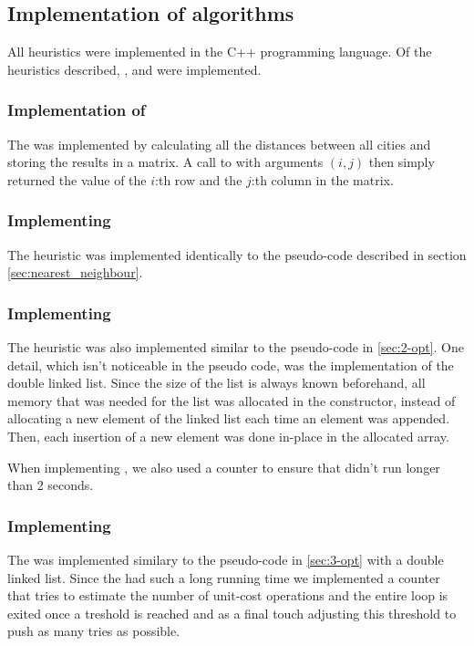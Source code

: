 \subsection{Implementation of algorithms}
\label{sec:implementation_of_algorithms}
All heuristics were implemented in the C++ programming language. Of the
heuristics described, ,  and  were
implemented.

\subsubsection{Implementation of }
The  was implemented by calculating all the distances between
all cities and storing the results in a matrix. A call to  with
arguments $(i, j)$ then simply returned the value of the $i$:th row and the
$j$:th column in the matrix.

\subsubsection{Implementing }
The  heuristic was implemented identically to the 
pseudo-code described in section \ref{sec:nearest_neighbour}.

\subsubsection{Implementing }
\label{sec:implementing_2-opt}
The  heuristic was also implemented similar to the pseudo-code in
\ref{sec:2-opt}. One detail, which isn't noticeable in the pseudo code, was the
implementation of the double linked list. Since the size of the list is always
known beforehand, all memory that was needed for the list was allocated in the
constructor, instead of allocating a new element of the linked list each time
an element was appended. Then, each insertion of a new element was done 
in-place in the allocated array.

When implementing , we also used a counter to ensure that
 didn't run longer than 2 seconds.

\subsubsection{Implementing }
\label{sec:implementing_3-opt}
The  was implemented similary to the pseudo-code in \ref{sec:3-opt} with a double linked list. Since the  had such a long running time we implemented a counter that tries to estimate
the number of unit-cost operations and the entire loop is exited once a treshold is reached and as a final touch adjusting this threshold to push as many tries as possible.


